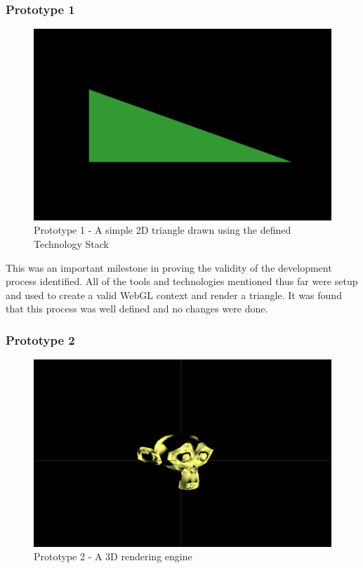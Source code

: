 \subsubsection {Prototype 1}
\begin{figure}[h]
    \centering
    \includegraphics[width=1\columnwidth]{author-files/figures/tri.png}
    \caption{Prototype 1 - A simple 2D triangle drawn using the defined Technology Stack}
    \label{fig:prototype1}
\end{figure}

This was an important milestone in proving the validity of the development process identified. All of the tools and technologies mentioned thus far were setup and used to create a valid WebGL context and render a triangle. It was found that this process was well defined and no changes were done.

\subsubsection {Prototype 2} \label{prototype2}
\begin{figure}[h]
    \centering
    \includegraphics[width=1\columnwidth]{author-files/figures/Monkey-Test2.png}
    \caption{Prototype 2 - A 3D rendering engine}
    \label{fig:Monkey}
\end{figure}

